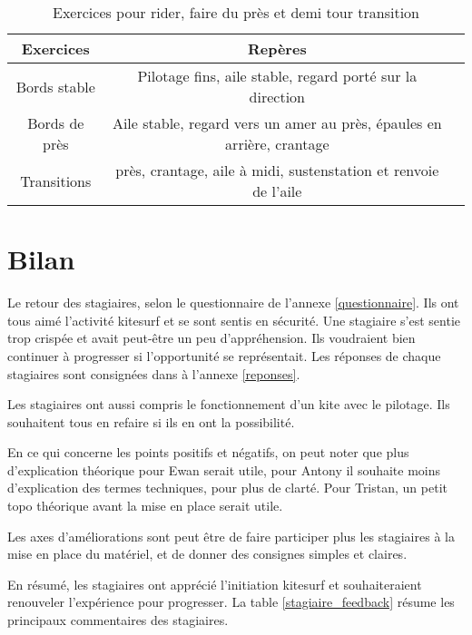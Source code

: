 \documentclass[11pt,a4paper]{report}
\begin{document}
\begin{table}[h]
\begin{tabular}{|c|c|c|}
\hline
\textbf{Exercices}     &  \textbf{Repères}      \\
\hline 
Bords stable & Pilotage fins, aile stable, regard porté sur la direction   \\
\hline
Bords de près  & Aile stable, regard vers un amer au près, épaules en arrière, crantage  \\
\hline 
Transitions & près, crantage, aile à midi, sustenstation et renvoie de l'aile \\
\hline
\end{tabular}
\caption{Exercices pour rider, faire du près et demi tour transition\label{seance_pilotage2}}
\end{table}
\section{Bilan}
Le retour des stagiaires, selon le questionnaire de l'annexe \ref{questionnaire}.
Ils ont tous aimé l'activité kitesurf et se sont sentis en sécurité.
Une stagiaire s'est sentie trop crispée et avait peut-\^etre un peu d'appréhension.
Ils  voudraient bien continuer à progresser si l'opportunité se représentait.
Les réponses de chaque stagiaires sont consignées dans à l'annexe \ref{reponses}.

Les stagiaires ont aussi compris le fonctionnement d'un kite avec le pilotage.
Ils souhaitent tous en refaire si ils en ont la possibilité.

En ce qui concerne les points positifs et négatifs, on peut noter
que plus d'explication théorique pour Ewan serait utile, pour Antony
il souhaite moins d'explication des termes techniques, pour plus de clarté.
Pour Tristan, un petit topo théorique avant la mise en place serait utile.

Les axes d'améliorations sont peut \^etre de faire participer
plus les stagiaires à la mise en place du matériel, et de
donner des consignes simples et claires. 

En résumé, les stagiaires ont apprécié l'initiation kitesurf et
souhaiteraient renouveler l'expérience pour progresser. La table
\ref{stagiaire_feedback} résume les principaux commentaires des stagiaires.
\end{document}

